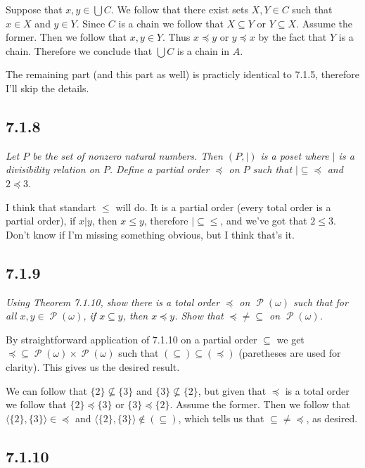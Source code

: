 \documentclass[11pt,oneside,titlepage]{book}
\DeclareMathOperator \pow {\mathcal {P}}
\newcommand{\eangle}[1]{\langle #1 \rangle}
\newcommand{\set}[1]{\{ #1 \}}
\begin{document}
Suppose that $x, y \in \bigcup{C}$. We follow that there exist sets $X, Y \in C$ such that
$x \in X$ and $y \in Y$. Since $C$ is a chain we follow that $X \subseteq Y$ or $Y \subseteq X$.
Assume the former. Then we follow that $x, y \in Y$. Thus $x \preceq y$ or $y \preceq x$
by the fact that $Y$ is a chain. Therefore we conclude that $\bigcup{C}$ is a chain in $A$.

The remaining part (and this part as well) is practicly identical to 7.1.5, therefore
I'll skip the details.

\subsection*{7.1.8}

\textit{Let $P$ be the set of nonzero natural numbers. Then $(P, |)$ is a poset
  where $|$ is a divisibility relation on $P$. Define a partial order $\preceq$ on $P$
  such that $| \subseteq \preceq$ and $2 \preceq 3$.}

I think that standart $\leq$ will do. It is a partial order
(every total order is a partial order), if $x | y$, then $x \leq y$, therefore $| \subseteq \leq$,
and we've got that $2 \leq 3$. Don't know if I'm missing something obvious, but I think
that's it.

\subsection*{7.1.9}

\textit{Using Theorem 7.1.10, show there is a total order $\preceq$ on $\pow(\omega)$
  such that for all $x, y \in \pow(\omega)$, if $x \subseteq y$, then $x \preceq y$.
  Show that $\preceq \neq \subseteq$ on $\pow(\omega)$.}

By straightforward application of 7.1.10 on a partial order $\subseteq$ we get
$\preceq \subseteq \pow(\omega) \times \pow(\omega)$ such that $(\subseteq) \subseteq (\preceq)$
(paretheses are used for clarity). This gives us the desired result.

We can follow that $\set{2} \not \subseteq \set{3}$ and  $\set{3} \not \subseteq \set{2}$,
but given that $\preceq$ is a total order we follow that
$\set{2} \preceq \set{3}$ or  $\set{3} \preceq \set{2}$. Assume the former. Then we follow that
$\eangle{\set{2}, \set{3}} \in \preceq$ and $\eangle{\set{2}, \set{3}} \notin (\subseteq)$,
which tells us that $\subseteq \neq \preceq$, as desired.

\subsection*{7.1.10}
\end{document}
